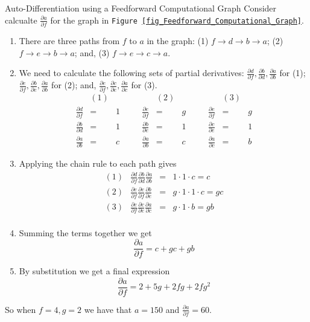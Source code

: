 \documentclass[11pt,a4paper]{article}
\begin{document}
  \begin{example}{Auto-Differentiation using a Feedforward Computational Graph}
    Consider calcualte $\frac{\partial a}{\partial f}$ for the graph in  \texttt{Figure \ref{fig_Feedforward_Computational_Graph}}.
    \begin{enumerate}
      \item There are three paths from $f$ to $a$ in the graph: (1) $f\to d\to b\to a$; (2) $f\to e\to b\to a$; and, (3) $f\to e\to c\to a$.
      \item We need to calculate the following sets of partial derivatives: $\frac{\partial d}{\partial f},\frac{\partial b}{\partial d},\frac{\partial a}{\partial b}$ for (1); $\frac{\partial e}{\partial f},\frac{\partial b}{\partial e},\frac{\partial a}{\partial b}$ for (2); and, $\frac{\partial e}{\partial f},\frac{\partial c}{\partial e},\frac{\partial a}{\partial c}$ for (3).
      \[\begin{array}{rclcrclcrcl}
        &(1)&&&&(2)&&&&(3)\\
        \frac{\partial d}{\partial f}&=&1&\quad&\frac{\partial e}{\partial f}&=&g&\quad&\frac{\partial e}{\partial f}&=&g\\
        \frac{\partial b}{\partial d}&=&1&\quad&\frac{\partial b}{\partial e}&=&1&\quad&\frac{\partial c}{\partial e}&=&1\\
        \frac{\partial a}{\partial b}&=&c&\quad&\frac{\partial a}{\partial b}&=&c&\quad&\frac{\partial a}{\partial c}&=&b
      \end{array}\]
      \item Applying the chain rule to each path gives
      \[\begin{array}{rrcl}
        (1)&\frac{\partial d}{\partial f}\frac{\partial b}{\partial d}\frac{\partial a}{\partial b}&=&1\cdot1\cdot c=c\\
        (2)&\frac{\partial e}{\partial f}\frac{\partial e}{\partial f}\frac{\partial b}{\partial e}&=&g\cdot1\cdot1\cdot c=gc\\
        (3)&\frac{\partial e}{\partial f}\frac{\partial c}{\partial e}\frac{\partial a}{\partial c}&=&g\cdot1\cdot b=gb\\
      \end{array}\]
      \item Summing the terms together we get
      \[ \frac{\partial a}{\partial f}=c+gc+gb \]
      \item By substitution we get a final expression
      \[ \frac{\partial a}{\partial f}=2+5g+2fg+2fg^2 \]
    \end{enumerate}
    So when $f=4,g=2$ we have that $a=150$ and $\frac{\partial a}{\partial f}=60$.
  \end{example}
\end{document}
